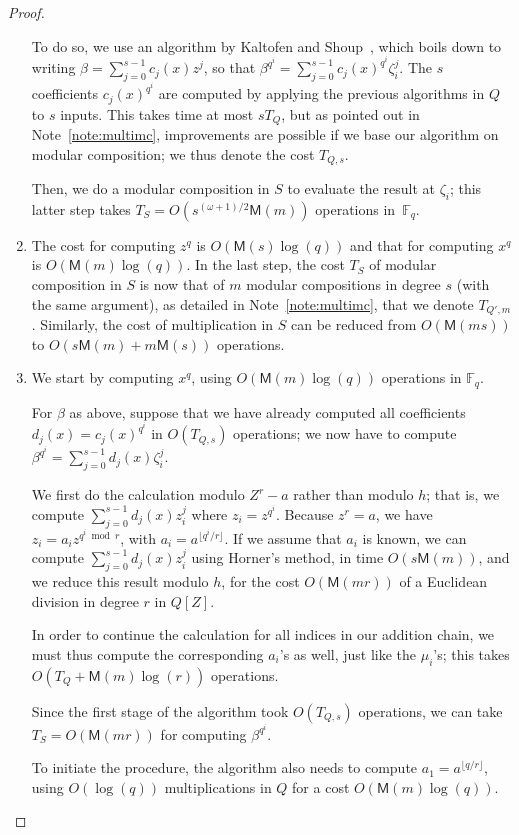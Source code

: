 \documentclass{mcom-l}
\theoremstyle{plain}
\theoremstyle{definition}
\newcommand{\F}{\ensuremath{\mathbb{F}}}
\newcommand{\MM}{\ensuremath{\mathsf{M}}}
\newcounter{algorithm}
\begin{document}
\begin{proof}
\begin{enumerate}[label=\textbf{Case~\theenumi.},leftmargin=*, align=left]
  To do so, we use an algorithm by Kaltofen and Shoup~\cite{kaltofen+shoup97},
  which boils down to writing $\beta=\sum_{j=0}^{s-1} c_j(x) z^j$, so
  that $\beta^{q^i} = \sum_{j=0}^{s-1} c_j(x)^{q^i} \zeta_i^j.$ The
  $s$ coefficients $c_j(x)^{q^i}$ are computed by applying the
  previous algorithms in $Q$ to $s$ inputs. This takes time at most
  $sT_Q$, but as pointed out in Note~\ref{note:multimc}, improvements 
  are possible if we base our algorithm on modular composition;
  we thus denote the cost $T_{Q,s}$.

  Then, we do a modular composition in $S$ to evaluate the result at
  $\zeta_i$; this latter step takes $T_S=O(s^{(\omega+1)/2} \MM(m))$
  operations in~$\F_q$.

\item
  The cost for computing $z^q$ is
  $O(\MM(s)\log(q))$ and that for computing $x^q$ is $O(\MM(m)\log(q))$.
  In the last step, the cost $T_S$ of modular
  composition in $S$ is now that of $m$ modular compositions in degree
  $s$ (with the same argument), as detailed in
  Note~\ref{note:multimc}, that we denote $T_{Q',m}$.
  Similarly, the cost of multiplication in $S$ can be reduced
  from $O(\MM(ms))$ to $O(s\MM(m) + m\MM(s))$ operations.

\item
  We start by computing $x^q$, using $O(\MM(m)\log(q))$ operations in
  $\F_q$.

  For $\beta$ as above, suppose that we have already computed all
  coefficients $d_j(x)=c_j(x)^{q^i}$ in $O(T_{Q,s})$ operations;
  we now have to compute $\beta^{q^i} = \sum_{j=0}^{s-1} d_j(x) \zeta_i^j$.

  We first do the calculation modulo $Z^r-a$ rather than modulo $h$;
  that is, we compute $\sum_{j=0}^{s-1} d_j(x) z_i^j$ where
  $z_i=z^{q^i}$.
  Because $z^r=a$, we
  have $z_i = a_i z^{q^i \bmod r}$, with $a_i =
  a^{\lfloor q^i/r\rfloor}$. If we assume that $a_i$ is
  known, we can compute $\sum_{j=0}^{s-1} d_j(x) z_i^j$ using
  Horner's method, in time $O(s \MM(m))$, and we reduce this result
  modulo $h$, for the cost $O(\MM(mr))$ of a Euclidean division in
  degree $r$ in $Q[Z]$. 

  In order to continue the calculation for all indices in our addition
  chain, we must thus compute the corresponding $a_i$'s as well,
  just like the $\mu_i$'s;
  this takes $O(T_{Q}+\MM(m)\log(r))$ operations.

  Since the first stage of the algorithm took $O(T_{Q,s})$ operations,
  we can take $T_S = O(\MM(mr))$
  for computing $\beta^{q^i}$.
  
  To initiate the procedure, the algorithm also needs to compute
  $a_1=a^{\lfloor q/r\rfloor}$, using $O(\log(q))$
  multiplications in $Q$ for a cost $O(\MM(m)\log(q))$. \qedhere
\end{enumerate}
\end{proof}
\end{document}
